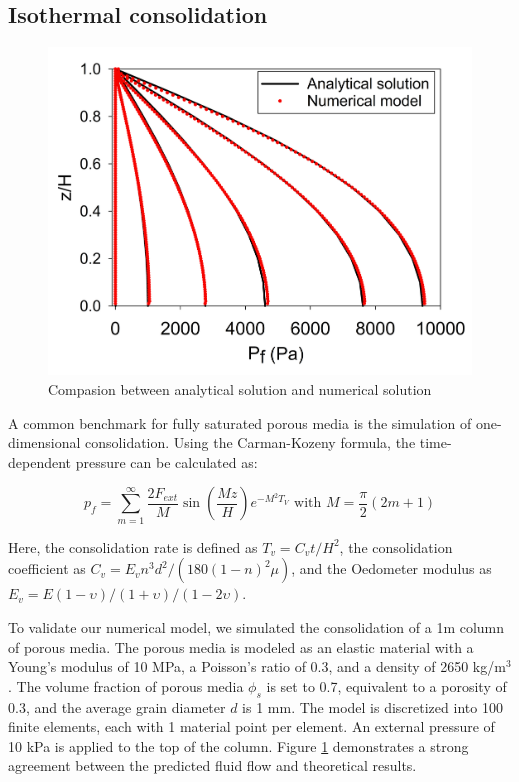 \documentclass[preprint,12pt]{elsarticle}
\begin{document}
\subsection{\textsf{Isothermal consolidation}}
%
%
\begin{figure}[h]
\center
\includegraphics[scale=.3]{consolidation.jpg}
\caption{Compasion between analytical solution and numerical solution}
\label{fig:consolidation}
\end {figure}
%
%
A common benchmark for fully saturated porous media is the simulation of one-dimensional consolidation. Using the Carman-Kozeny formula, the time-dependent pressure can be calculated as:

\begin{equation}
p_f = \sum_{m=1}^{\infty} \frac{2F_{ext}}{M} \sin (\frac{Mz}{H}) e^{-M^2T_V} \textrm{ with } M = \frac{\pi}{2} (2m+1)
\end {equation}

Here, the consolidation rate is defined as $T_v =C_vt/H^2$, the consolidation coefficient as $C_v = E_v n^3 d^2/(180(1-n)^2\mu)$, and the Oedometer modulus as $E_v = E(1-\upsilon)/(1+\upsilon)/(1-2\upsilon)$.

To validate our numerical model, we simulated the consolidation of a 1m column of porous media. The porous media is modeled as an elastic material with a Young's modulus of 10 MPa, a Poisson's ratio of 0.3, and a density of 2650 kg/m$^{3}$. The volume fraction of porous media $\phi_s$ is set to 0.7, equivalent to a porosity of 0.3, and the average grain diameter $d$ is 1 mm. The model is discretized into 100 finite elements, each with 1 material point per element. An external pressure of 10 kPa is applied to the top of the column. Figure \ref{fig:consolidation} demonstrates a strong agreement between the predicted fluid flow and theoretical results.
\end{document}
